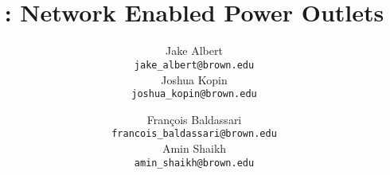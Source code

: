 \documentclass[12pt,a4paper,notitlepage]{report}
\begin{document}
	\date{$\;$\\
$\;$\\ $\;$ \\}
\author{
	Jake Albert \vspace{-5mm} \\ \small \texttt{jake\_albert@brown.edu}
	\\
	Joshua Kopin \vspace{-5mm} \\ \small \texttt{joshua\_kopin@brown.edu}
	\and	
	Fran\c{c}ois Baldassari \vspace{-5mm} \\ \small \texttt{francois\_baldassari@brown.edu}
	\\
	Amin Shaikh \vspace{-5mm} \\ \small \texttt{amin\_shaikh@brown.edu}
}
\title{\underline{\course}\\ \netlets : Network Enabled Power Outlets\\ 
}
\maketitle



\pagebreak

\pagestyle{fancy}
\fancyhf{}
\renewcommand{\sectionmark}[1]{\markboth{\thesection\ #1}{}}
\renewcommand{\subsectionmark}[1]{\markright{\thesubsection\ #1}{}}
\lhead{\leftmark}
\rhead{\rightmark}
\cfoot{\thepage}

\tableofcontents



 










\pagestyle{plain}
\nocite{*}
\renewcommand{\bibname}{References} 
\printbibliography
\end{document}

